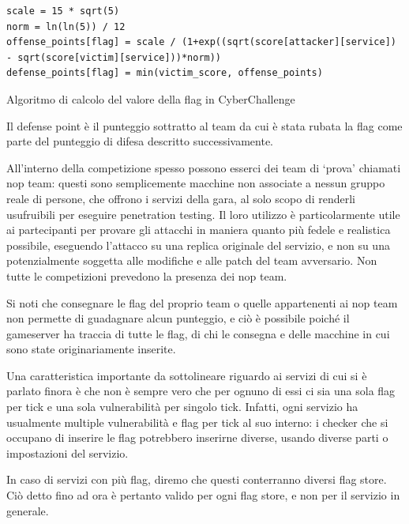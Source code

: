 \begin{listing}[H]
\begin{verbatim}
scale = 15 * sqrt(5) 
norm = ln(ln(5)) / 12 
offense_points[flag] = scale / (1+exp((sqrt(score[attacker][service]) - sqrt(score[victim][service]))*norm))
defense_points[flag] = min(victim_score, offense_points)
\end{verbatim}
\vspace{-1em}
\caption{Algoritmo di calcolo del valore della flag in CyberChallenge}\label{lst:flagcalc}
\end{listing}

Il defense point è il punteggio sottratto al team da cui è stata rubata la flag come parte del punteggio di difesa descritto successivamente.

All'interno della competizione spesso possono esserci dei team di `prova' chiamati \gls{nop} team: questi sono semplicemente macchine non associate a nessun gruppo reale di persone, che offrono i servizi della gara, al solo scopo di renderli usufruibili per eseguire penetration testing. Il loro utilizzo è particolarmente utile ai partecipanti per provare gli attacchi in maniera quanto più fedele e realistica possibile, eseguendo l'attacco su una replica originale del servizio, e non su una potenzialmente soggetta alle modifiche e alle patch del team avversario. Non tutte le competizioni prevedono la presenza dei \gls{nop} team.

Si noti che consegnare le flag del proprio team o quelle appartenenti ai \gls{nop} team non permette di guadagnare alcun punteggio, e ciò è possibile poiché il gameserver ha traccia di tutte le flag, di chi le consegna e delle macchine in cui sono state originariamente inserite.

Una caratteristica importante da sottolineare riguardo ai servizi di cui si è parlato finora è che non è sempre vero che per ognuno di essi ci sia una sola flag per tick e una sola vulnerabilità per singolo tick. Infatti, ogni servizio ha usualmente multiple vulnerabilità e flag per tick al suo interno: i checker che si occupano di inserire le flag potrebbero inserirne diverse, usando diverse parti o impostazioni del servizio.

In caso di servizi con più flag, diremo che questi conterranno diversi flag store. Ciò detto fino ad ora è pertanto valido per ogni flag store, e non per il servizio in generale.

